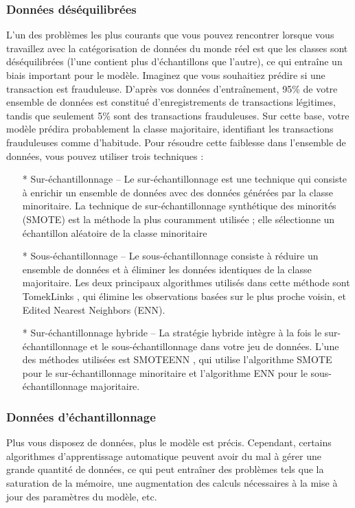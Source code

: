 \documentclass[a4paper, 12pt]{article}
\begin{document}
	\subsubsection{Données déséquilibrées}L’un des problèmes les plus courants que vous pouvez rencontrer lorsque vous travaillez avec la catégorisation de données du monde réel est que les classes sont déséquilibrées (l’une contient plus d’échantillons que l’autre), ce qui entraîne un biais important pour le modèle.
	Imaginez que vous souhaitiez prédire si une transaction est frauduleuse. D'après vos données d'entraînement, 95\% de votre ensemble de données est constitué d'enregistrements de transactions légitimes, tandis que seulement 5\% sont des transactions frauduleuses. Sur cette base, votre modèle prédira probablement la classe majoritaire, identifiant les transactions frauduleuses comme d'habitude.
	Pour résoudre cette faiblesse dans l’ensemble de données, vous pouvez utiliser trois techniques :
	\begin{itemize}
		\item[*] 	Sur-échantillonnage – Le sur-échantillonnage est une technique qui consiste à enrichir un ensemble de données avec des données générées par la classe minoritaire. La technique de sur-échantillonnage synthétique des minorités (SMOTE) est la méthode la plus couramment utilisée ; elle sélectionne un échantillon aléatoire de la classe minoritaire
		\item[*] 	Sous-échantillonnage – Le sous-échantillonnage consiste à réduire un ensemble de données et à éliminer les données identiques de la classe majoritaire. Les deux principaux algorithmes utilisés dans cette méthode sont TomekLinks , qui élimine les observations basées sur le plus proche voisin, et Edited Nearest Neighbors (ENN).
		\item[*] Sur-échantillonnage hybride – La stratégie hybride intègre à la fois le sur-échantillonnage et le sous-échantillonnage dans votre jeu de données. L'une des méthodes utilisées est SMOTEENN , qui utilise l'algorithme SMOTE pour le sur-échantillonnage minoritaire et l'algorithme ENN pour le sous-échantillonnage majoritaire.
	\end{itemize}
	\subsubsection{Données d'échantillonnage}Plus vous disposez de données, plus le modèle est précis. Cependant, certains algorithmes d'apprentissage automatique peuvent avoir du mal à gérer une grande quantité de données, ce qui peut entraîner des problèmes tels que la saturation de la mémoire, une augmentation des calculs nécessaires à la mise à jour des paramètres du modèle, etc.
	
\end{document}
